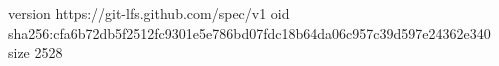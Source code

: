 version https://git-lfs.github.com/spec/v1
oid sha256:cfa6b72db5f2512fc9301e5e786bd07fdc18b64da06c957c39d597e24362e340
size 2528
